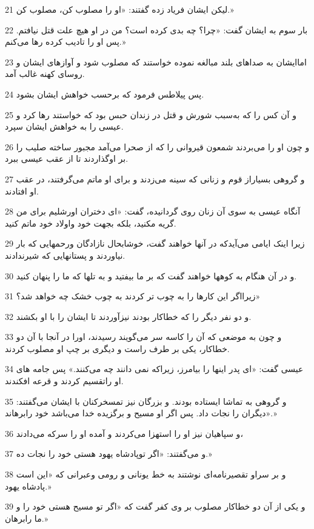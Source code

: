 \par 21 لیکن ایشان فریاد زده گفتند: «او را مصلوب کن، مصلوب کن.»
\par 22 بار سوم به ایشان گفت: «چرا؟ چه بدی کرده است؟ من در او هیچ علت قتل نیافتم. پس او را تادیب کرده رها می‌کنم.»
\par 23 اماایشان به صداهای بلند مبالغه نموده خواستند که مصلوب شود و آوازهای ایشان و روسای کهنه غالب آمد.
\par 24 پس پیلاطس فرمود که برحسب خواهش ایشان بشود.
\par 25 و آن کس را که به‌سبب شورش و قتل در زندان حبس بود که خواستند رها کرد و عیسی را به خواهش ایشان سپرد.
\par 26 و چون او را می‌بردند شمعون قیروانی را که از صحرا می‌آمد مجبور ساخته صلیب را بر اوگذاردند تا از عقب عیسی ببرد.
\par 27 و گروهی بسیاراز قوم و زنانی که سینه می‌زدند و برای او ماتم می‌گرفتند، در عقب او افتادند.
\par 28 آنگاه عیسی به سوی آن زنان روی گردانیده، گفت: «ای دختران اورشلیم برای من گریه مکنید، بلکه بجهت خود واولاد خود ماتم کنید.
\par 29 زیرا اینک ایامی می‌آیدکه در آنها خواهند گفت، خوشابحال نازادگان ورحمهایی که بار نیاوردند و پستانهایی که شیرندادند.
\par 30 و در آن هنگام به کوهها خواهند گفت که بر ما بیفتید و به تلها که ما را پنهان کنید.
\par 31 زیرااگر این کارها را به چوب تر کردند به چوب خشک چه خواهد شد؟»
\par 32 و دو نفر دیگر را که خطاکار بودند نیزآوردند تا ایشان را با او بکشند.
\par 33 و چون به موضعی که آن را کاسه سر می‌گویند رسیدند، اورا در آنجا با آن دو خطاکار، یکی بر طرف راست و دیگری بر چپ او مصلوب کردند.
\par 34 عیسی گفت: «ای پدر اینها را بیامرز، زیراکه نمی دانند چه می‌کنند.» پس جامه های او راتقسیم کردند و قرعه افکندند.
\par 35 و گروهی به تماشا ایستاده بودند. و بزرگان نیز تمسخرکنان با ایشان می‌گفتند: «دیگران را نجات داد. پس اگر او مسیح و برگزیده خدا می‌باشد خود رابرهاند.»
\par 36 و سپاهیان نیز او را استهزا می‌کردند و آمده او را سرکه می‌دادند،
\par 37 و می‌گفتند: «اگر توپادشاه یهود هستی خود را نجات ده.»
\par 38 و بر سراو تقصیرنامه‌ای نوشتند به خط یونانی و رومی وعبرانی که «این است پادشاه یهود.»
\par 39 و یکی از آن دو خطاکار مصلوب بر وی کفر گفت که «اگر تو مسیح هستی خود را و ما رابرهان.»
